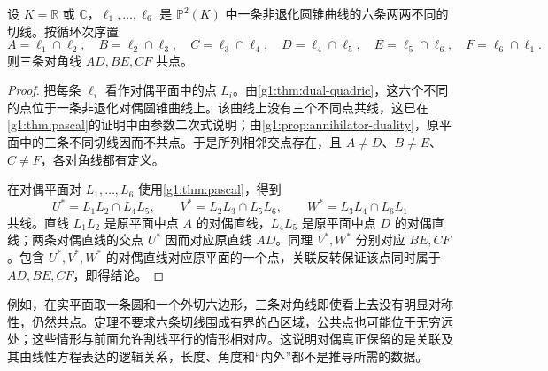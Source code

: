 \begin{theorem}\label{g1:thm:brianchon}
	设 \(K=\mathbb R\) 或 \(\mathbb C\)，\(\ell_1,\ldots,\ell_6\) 是 \(\mathbb P^2(K)\) 中一条非退化圆锥曲线的六条两两不同的切线。按循环次序置
	\[
		A=\ell_1\cap\ell_2,\quad B=\ell_2\cap\ell_3,\quad C=\ell_3\cap\ell_4,
		\quad D=\ell_4\cap\ell_5,\quad E=\ell_5\cap\ell_6,\quad F=\ell_6\cap\ell_1.
	\]
	则三条对角线 \(AD,BE,CF\) 共点。
\end{theorem}
\begin{proof}
	把每条 \(\ell_i\) 看作对偶平面中的点 \(L_i\)。由\cref{g1:thm:dual-quadric}，这六个不同的点位于一条非退化对偶圆锥曲线上。该曲线上没有三个不同点共线，这已在\cref{g1:thm:pascal}的证明中由参数二次式说明；由\cref{g1:prop:annihilator-duality}，原平面中的三条不同切线因而不共点。于是所列相邻交点存在，且 \(A\ne D\)、\(B\ne E\)、\(C\ne F\)，各对角线都有定义。

	在对偶平面对 \(L_1,\ldots,L_6\) 使用\cref{g1:thm:pascal}，得到
	\[
		U^*=L_1L_2\cap L_4L_5,\qquad
		V^*=L_2L_3\cap L_5L_6,\qquad
		W^*=L_3L_4\cap L_6L_1
	\]
	共线。直线 \(L_1L_2\) 是原平面中点 \(A\) 的对偶直线，\(L_4L_5\) 是原平面中点 \(D\) 的对偶直线；两条对偶直线的交点 \(U^*\) 因而对应原直线 \(AD\)。同理 \(V^*,W^*\) 分别对应 \(BE,CF\)。包含 \(U^*,V^*,W^*\) 的对偶直线对应原平面的一个点，关联反转保证该点同时属于 \(AD,BE,CF\)，即得结论。
\end{proof}

例如，在实平面取一条圆和一个外切六边形，三条对角线即使看上去没有明显对称性，仍然共点。定理不要求六条切线围成有界的凸区域，公共点也可能位于无穷远处；这些情形与前面允许割线平行的情形相对应。这说明对偶真正保留的是关联及其由线性方程表达的逻辑关系，长度、角度和“内外”都不是推导所需的数据。
